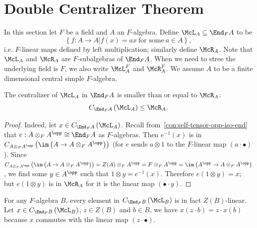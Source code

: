 

\section{Double Centralizer Theorem}\label{sec:double-centralizer}

In this section let $F$ be a field and $A$ an $F$-algebra. Define
$\McL_{A} \subseteq \End_{F}A$ to be
\[\left\{f : A \to A|f(x)=ax~\text{for some}~a\in A\right\},\]
i.e. $F$-linear maps defined by left multiplication; similarly define
$\McR_{A}$. Note that $\McL_{A}$ and $\McR_A$ are $F$-subalgebras of
$\End_{F}A$. When we need to stree the underlying field is $F$, we also write
$\McL_{A}^{F}$ and $\McR_{A}^{F}$. We assume $A$ to be a finite dimensional
central simple $F$-algebra.
\begin{lemma}
  \label{lem:centralizer-mul-left-le}
  The centralizer of $\McL_{A}$ in $\End_{F}A$ is smaller than or equal to
  $\McR_{A}$:
  \[
    C_{\End_{F}A}\left(\McL_{A}\right) \le \McR_{A}.
  \]
  \leanok
\end{lemma}

\begin{proof}
  Indeed, let $x \in C_{\End_{F}A}\left(\McL_{A}\right)$. Recall
  from~\cref{con:self-tensor-opp-iso-end} that
  $e : A\otimes_{F}A^{\opp}\cong \End_{F}A$ as $F$-algebras. Then $e^{-1}(x)$ is
  in
  $C_{A\otimes_{F}A^{\opp}}\left(\im\left(A\to A\otimes_{F}A^{\opp}\right)\right)$
  (for $e$ sends $a\otimes 1$ to the $F$-linear map $(a\cdot\bullet)$). Since
  $C_{A\otimes_{F}A^{\opp}}\left(\im\left(A\to A\otimes_{F}A^{\opp}\right)\right) = Z(A)\otimes_{F}A^{\opp}=F\otimes_{F}A^{\opp}=\im\left(A^{\opp}\to A\otimes_{F}A^{\opp}\right)$,
  we find some $y\in A^{\opp}$ such that $1 \otimes y = e^{-1}(x)$. Therefore
  $e\left(1\otimes y\right) = x$; but $e\left(1\otimes y\right)$ is in
  $\McR_{A}$ for it is the linear map $(\bullet\cdot y)$.
\end{proof}

\begin{remark}\label{rem:mul-left-center-linear}
  For any $F$-algebra $B$, every element in $C_{\End_{F}B}\left(\McL_{B}\right)$
  is in fact $Z(B)$-linear. Let $x\in C_{\End_{F}B}\left(\McL_{B}\right)$,
  $z\in Z(B)$ and $b \in B$, we have $x(z\cdot b) = z\cdot x(b)$ because $x$
  commutes with the linear map $\left(z\cdot\bullet\right)$.
\end{remark}

